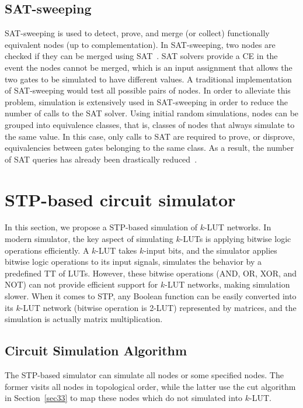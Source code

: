 \documentclass[conference]{IEEEtran}
\begin{document}
\subsection{SAT-sweeping}
\label{sec23}
SAT-sweeping is used to detect, prove, and merge (or collect) functionally equivalent nodes (up to complementation). 
In SAT-sweeping, two nodes are checked if they can be merged using SAT~\cite{pri4,sweep2}. 
SAT solvers provide a CE in the event the nodes cannot be merged, which is an input assignment that allows the two gates to be simulated to have different values.
A traditional implementation of SAT-sweeping would test all possible pairs of nodes.
In order to alleviate this problem, simulation is extensively used in SAT-sweeping in order to reduce the number of calls to the SAT solver.
Using initial random simulations, nodes can be grouped into equivalence classes, that is, classes of nodes that always simulate to the same value.
In this case, only calls to SAT are required to prove, or disprove, equivalencies between gates belonging to the same class.
As a result, the number of SAT queries has already been drastically reduced~\cite{sweep1}. 

\vspace{-2mm}
\section{STP-based circuit simulator}
\label{sec3}
In this section, we propose a STP-based simulation of $k$-LUT networks.
In modern simulator, the key aspect of simulating $k$-LUTs is applying bitwise logic operations efficiently. 
A $k$-LUT takes $k$-input bits, and the simulator applies bitwise logic operations to its input signals, simulates the behavior by a predefined TT of LUTs.
However, these bitwise operations (AND, OR, XOR, and NOT) can not provide efficient support for $k$-LUT networks, making simulation slower.
When it comes to STP, any Boolean function can be easily converted into its $k$-LUT network (bitwise operation is 2-LUT) represented by matrices, and the simulation is actually matrix multiplication.

\subsection{Circuit Simulation Algorithm}
\label{sec31}
The STP-based simulator can simulate all nodes or some specified nodes.
The former visits all nodes in topological order, while the latter use the cut algorithm in Section~\ref{sec33} to map these nodes which do not simulated into $k$-LUT. 
\end{document}
